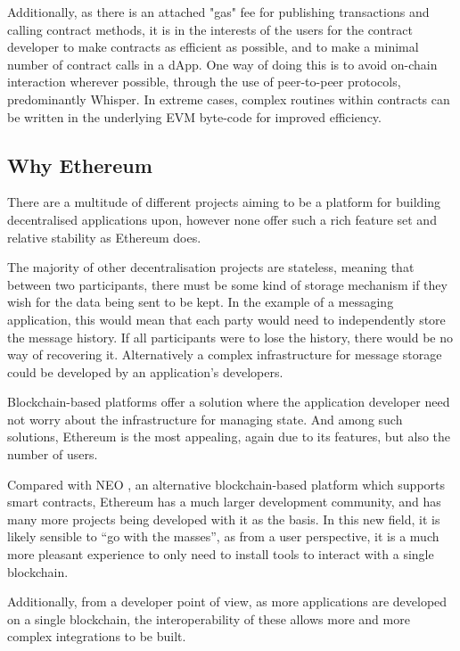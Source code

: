 Additionally, as there is an attached "gas" fee for publishing transactions and calling contract methods, it is in the interests of the users for the contract developer to make contracts as efficient as possible, and to make a minimal number of contract calls in a dApp. One way of doing this is to avoid on-chain interaction wherever possible, through the use of peer-to-peer protocols, predominantly Whisper. In extreme cases, complex routines within contracts can be written in the underlying EVM byte-code for improved efficiency.

\subsection{Why Ethereum}

There are a multitude of different projects aiming to be a platform for building decentralised applications upon, however none offer such a rich feature set and relative stability as Ethereum does.

The majority of other decentralisation projects are stateless, meaning that between two participants, there must be some kind of storage mechanism if they wish for the data being sent to be kept. In the example of a messaging application, this would mean that each party would need to independently store the message history. If all participants were to lose the history, there would be no way of recovering it. Alternatively a complex infrastructure for message storage could be developed by an application's developers.

Blockchain-based platforms offer a solution where the application developer need not worry about the infrastructure for managing state. And among such solutions, Ethereum is the most appealing, again due to its features, but also the number of users.

Compared with NEO \cite{NEO}, an alternative blockchain-based platform which supports smart contracts, Ethereum has a much larger development community, and has many more projects being developed with it as the basis. In this new field, it is likely sensible to \enquote{go with the masses}, as from a user perspective, it is a much more pleasant experience to only need to install tools to interact with a single blockchain.

Additionally, from a developer point of view, as more applications are developed on a single blockchain, the interoperability of these allows more and more complex integrations to be built.
